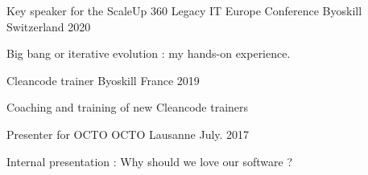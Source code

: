 

\begin{cventries}
    
\cventry
{Key speaker for the ScaleUp 360 Legacy IT Europe Conference } %
{Byoskill} %
{Switzerland} %
{2020} %
{
    \begin{cvitems} %
        \item {Big bang or iterative evolution : my hands-on experience.}
    \end{cvitems}
}\cventry
{Cleancode trainer} %
{Byoskill} %
{France} %
{2019} %
{
    \begin{cvitems} %
        \item {Coaching and training of new Cleancode trainers}
    \end{cvitems}
}
\cventry
{Presenter for OCTO} %
{OCTO} %
{Lausanne} %
{July. 2017} %
{
    \begin{cvitems} %
        \item {Internal presentation : Why should we love our software ?}
    \end{cvitems}
}


\end{cventries}
